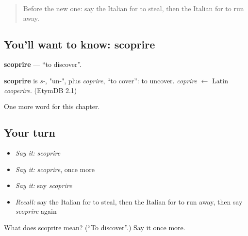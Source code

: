 \label{lesson:IT-C181-scoprire}



\begin{quote}
Before the new one: say the Italian for to steal, then the Italian for to run away.
\end{quote}

\subsection*{You'll want to know: scoprire}
\textbf{scoprire} — \textquotedblleft{}to discover\textquotedblright{}.

\begin{cousinweb}
\textbf{scoprire} is \emph{s-}, "un-", plus \emph{coprire}, \textquotedblleft{}to cover\textquotedblright{}: to uncover. \emph{coprire} $\leftarrow$ Latin \emph{cooperire}. (EtymDB 2.1)
\end{cousinweb}

\begin{grammarlens}[title={What you've built}]
One more word for this chapter.
\end{grammarlens}

\subsection*{Your turn}
\begin{itemize}
\raggedright
  \item \emph{Say it:} \emph{scoprire}
  \item \emph{Say it:} \emph{scoprire}, once more
  \item \emph{Say it:} say \emph{scoprire}
  \item \emph{Recall:} say the Italian for to steal, then the Italian for to run away, then say \emph{scoprire} again
\end{itemize}

\begin{tcolorbox}[breakable,colback=teal!4,colframe=teal!35!black,title={Before you move on}]
What does scoprire mean? (\textquotedblleft{}To discover\textquotedblright{}.) Say it once more.
\end{tcolorbox}
